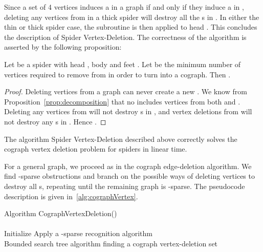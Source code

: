 \documentclass{llncs}
\begin{document}
Since a set of 4 vertices induces a  in a graph  if and only if they induce a  in , deleting any  vertices from  in a thick spider will destroy all the s in . In either the thin or thick spider case, the subroutine is then applied to head . This concludes the description of {\sc Spider Vertex-Deletion}. The correctness of the algorithm is asserted by the following proposition:

\begin{proposition}\label{prop:cographvertex}
Let  be a spider with head , body  and feet . Let  be the minimum number of vertices required to remove from  in order to turn  into a cograph. Then .
\end{proposition}

\begin{proof}
  Deleting vertices from a graph can never create a new . We know from Proposition~\ref{prop:decomposition} that no  includes vertices from both  and . Deleting any vertices from  will not destroy s in , and vertex deletions from  will not destroy any s in . Hence .
  \hfill 
\end{proof}

\begin{corollary}
  The algorithm {\sc Spider Vertex-Deletion} described above correctly solves the cograph vertex deletion problem for spiders in linear time.
\end{corollary}

For a general graph, we proceed as in the cograph edge-deletion algorithm. We find -sparse obstructions and branch on the possible ways of deleting vertices to destroy all s, repeating until the remaining graph is -sparse. The pseudocode description is given in~\ref{alg:cographVertex}.


\begin{algorithm}[H]
\SetAlgoLined Algorithm {\sc CographVertexDeletion()}\\
\ \\
Initialize \;
Apply a -sparse recognition algorithm\;
\ \\
\caption{Bounded search tree algorithm finding a cograph vertex-deletion set}
\label{alg:cographVertex}
\end{algorithm}
\end{document}
